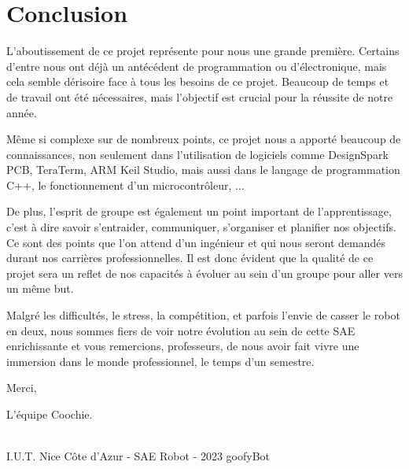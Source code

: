 \section{Conclusion}

L'aboutissement de ce projet représente pour nous une grande première.
Certains d’entre nous ont déjà un antécédent de programmation ou d'électronique, mais cela
semble dérisoire face à tous les besoins de ce projet. Beaucoup de temps et de
travail ont été nécessaires, mais l’objectif est crucial pour la réussite de notre année. 

Même si complexe sur de nombreux points, ce projet nous a apporté beaucoup de connaissances, non seulement dans l’utilisation de logiciels comme DesignSpark PCB, TeraTerm, ARM Keil Studio, mais aussi dans le langage de programmation C++, le fonctionnement d'un microcontrôleur, ...

De plus, l'esprit de groupe est également un point important de l'apprentissage, c'est à dire savoir s'entraider, communiquer, s'organiser et planifier nos objectifs. Ce sont des points que l'on attend d'un ingénieur et qui nous seront demandés durant nos carrières professionnelles. Il est donc évident que la qualité de ce projet sera un reflet de nos capacités à évoluer au sein d'un groupe pour aller vers un même but.

Malgré les difficultés, le stress, la compétition, et parfois l'envie de casser le robot en deux, nous sommes fiers de voir notre évolution au sein de cette SAE enrichissante et vous remercions, professeurs, de nous avoir fait vivre une immersion dans le monde professionnel, le temps d'un semestre.

\noindent Merci,

\noindent L'équipe Coochie.

\vfill
\noindent\makebox[\linewidth]{\rule{.8\paperwidth}{.6pt}}\\[0.2cm]
I.U.T. Nice Côte d'Azur - SAE Robot - 2023 \hfill goofyBot
\noindent\makebox[\linewidth]{\rule{.8\paperwidth}{.6pt}}